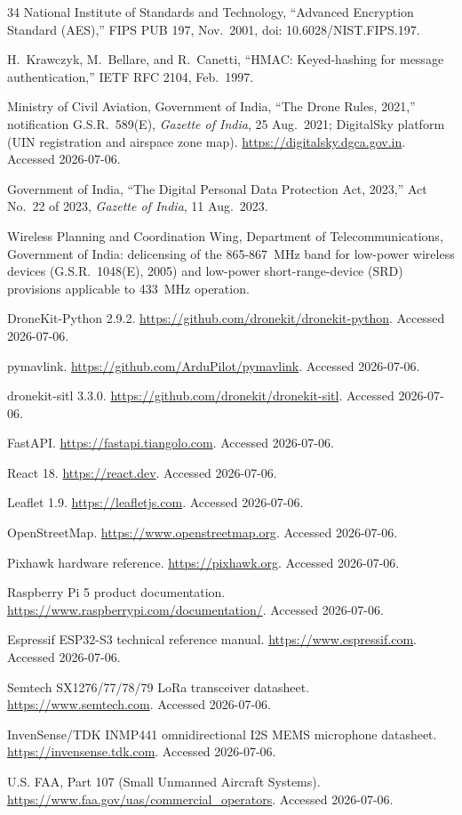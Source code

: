 \documentclass[12pt,a4paper]{report}
\begin{document}
\begin{thebibliography}{34}
National Institute of Standards and Technology, ``Advanced Encryption
Standard (AES),'' FIPS PUB 197, Nov.\ 2001, doi:
10.6028/NIST.FIPS.197.

H.~Krawczyk, M.~Bellare, and R.~Canetti, ``HMAC: Keyed-hashing for
message authentication,'' IETF RFC 2104, Feb.\ 1997.

Ministry of Civil Aviation, Government of India, ``The Drone Rules,
2021,'' notification G.S.R.~589(E), \emph{Gazette of India}, 25 Aug.\
2021; DigitalSky platform (UIN registration and airspace zone map).
\url{https://digitalsky.dgca.gov.in}. Accessed 2026-07-06.

Government of India, ``The Digital Personal Data Protection Act,
2023,'' Act No.~22 of 2023, \emph{Gazette of India}, 11 Aug.\ 2023.

Wireless Planning and Coordination Wing, Department of
Telecommunications, Government of India: delicensing of the
865-867~MHz band for low-power wireless devices (G.S.R.~1048(E),
2005) and low-power short-range-device (SRD) provisions applicable to
433~MHz operation.

DroneKit-Python 2.9.2.
\url{https://github.com/dronekit/dronekit-python}. Accessed
2026-07-06.

pymavlink. \url{https://github.com/ArduPilot/pymavlink}. Accessed
2026-07-06.

dronekit-sitl 3.3.0. \url{https://github.com/dronekit/dronekit-sitl}.
Accessed 2026-07-06.

FastAPI. \url{https://fastapi.tiangolo.com}. Accessed 2026-07-06.

React 18. \url{https://react.dev}. Accessed 2026-07-06.

Leaflet 1.9. \url{https://leafletjs.com}. Accessed 2026-07-06.

OpenStreetMap. \url{https://www.openstreetmap.org}. Accessed
2026-07-06.

Pixhawk hardware reference. \url{https://pixhawk.org}. Accessed
2026-07-06.

Raspberry Pi 5 product documentation.
\url{https://www.raspberrypi.com/documentation/}. Accessed 2026-07-06.

Espressif ESP32-S3 technical reference manual.
\url{https://www.espressif.com}. Accessed 2026-07-06.

Semtech SX1276/77/78/79 LoRa transceiver datasheet.
\url{https://www.semtech.com}. Accessed 2026-07-06.

InvenSense/TDK INMP441 omnidirectional I2S MEMS microphone datasheet.
\url{https://invensense.tdk.com}. Accessed 2026-07-06.

U.S. FAA, Part 107 (Small Unmanned Aircraft Systems).
\url{https://www.faa.gov/uas/commercial_operators}. Accessed
2026-07-06.

\end{thebibliography}
\end{document}

